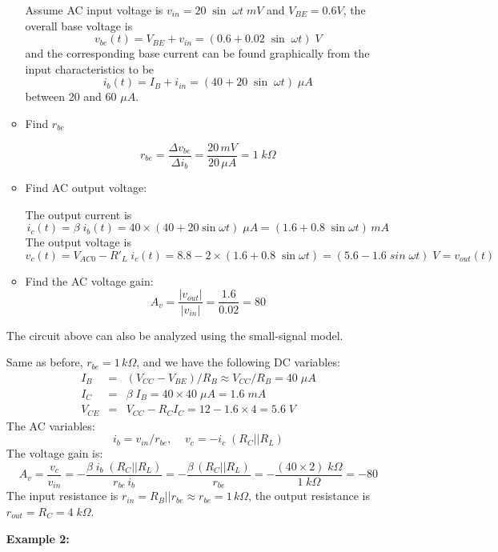\begin{itemize}
\begin{itemize}
  Assume AC input voltage is $v_{in}=20\;\sin\;\omega t\;mV$ and 
  $V_{BE}=0.6V$, the overall base voltage is
  \[
  v_{be}(t)=V_{BE}+v_{in}=(0.6+0.02\;\sin\;\omega t)\;V
  \]
  and the corresponding base current can be found graphically from the 
  input characteristics to be 
  \[
  i_b(t)=I_B+i_{in}=(40+20\;\sin\;\omega t)\;\mu A
  \] 
  between 20 and 60 $\mu A$. 
\item Find $r_{be}$
  
  \[
  r_{be}=\frac{\Delta v_{be}}{\Delta i_b} =\frac{20\,mV}{20\,\mu A}=1\;k\Omega
  \]

\item Find AC output voltage: 

  The output current is
  \[
  i_c(t)=\beta\; i_b(t)=40\times(40+20\sin\omega t)\;\mu A
  =(1.6+ 0.8 \;\sin\omega t)\,mA
  \]
  The output voltage is
  \[ 
  v_c(t)=V_{AC0}-R'_L\;i_c(t)=8.8-2\times(1.6+0.8\;\sin\omega t)
  =(5.6-1.6 \;sin\;\omega t)\;V=v_{out}(t)
  \]

\item Find the AC voltage gain:
  \[
  A_v=\frac{|v_{out}|}{|v_{in}|}=\frac{1.6}{0.02}=80	
\]
\end{itemize}


The circuit above can also be analyzed using the small-signal model. 


Same as before, $r_{be}=1 \,k\Omega$, and we have the following DC variables:
\begin{eqnarray}
  I_B&=&(V_{CC}-V_{BE})/R_B \approx V_{CC}/R_B=40 \;\mu A	
  \nonumber \\
  I_C&=&\beta\;I_B=40\times 40\;\mu A=1.6\;mA	
  \nonumber \\
  V_{CE}&=&V_{CC}-R_C I_C=12-1.6\times 4=5.6\;V	
  \nonumber
\end{eqnarray}
The AC variables:
\[
i_b=v_{in}/r_{be}, \;\;\;\;v_c=-i_c\; (R_C||R_L)
\]
The voltage gain is:
\[
A_v=\frac{v_c}{v_{in}}=-\frac{\beta\; i_b\;(R_C||R_L)}{r_{be}\,i_b}
=-\frac{\beta\,(R_C||R_L)}{r_{be}}
=-\frac{(40\times 2)\;k\Omega}{1\;k\Omega}=-80	
\]
The input resistance is $r_{in}=R_B||r_{be}\approx r_{be}=1\,k\Omega$,
the output resistance is $r_{out}=R_C=4\;k\Omega$.

{\bf Example 2:}


\end{itemize}
